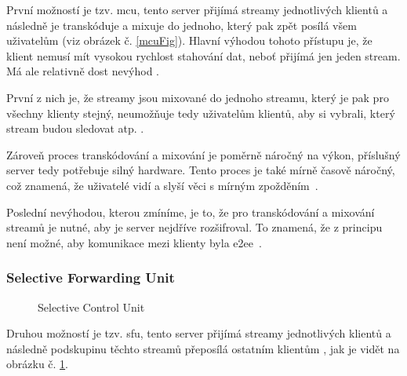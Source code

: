 První možností je tzv. \gls{mcu}, tento server přijímá streamy jednotlivých
klientů a následně je transkóduje a mixuje do jednoho, který pak zpět posílá
všem uživatelům (viz obrázek č. \ref{mcuFig}). Hlavní výhodou tohoto přístupu
je, že klient nemusí mít vysokou rychlost stahování dat, neboť přijímá jen jeden
stream. Má ale relativně dost nevýhod
\parencite{Red5Pro-WebRTCScalingApproaches}.

První z nich je, že streamy jsou mixované do jednoho streamu, který je pak pro
všechny klienty stejný, neumožňuje tedy uživatelům klientů, aby si vybrali,
který stream budou sledovat atp. \parencite{Red5Pro-WebRTCScalingApproaches}.

Zároveň proces transkódování a mixování je poměrně náročný na výkon, příslušný
server tedy potřebuje silný hardware. Tento proces je také mírně časově náročný,
což znamená, že uživatelé vidí a slyší věci s mírným
zpožděním~\parencite{Red5Pro-WebRTCScalingApproaches}.

Poslední nevýhodou, kterou zmíníme, je to, že pro transkódování a mixování
streamů je nutné, aby je server nejdříve rozšifroval. To znamená, že z principu
není možné, aby komunikace mezi klienty byla
\gls{e2ee}~\parencite{ITSecurityKnowHow-E2EGainsANewMeaning}.

\subsubsection{Selective Forwarding Unit}\label{sfu}

\begin{figure}[H]
    \centering
    \caption{Selective Control Unit}
    \label{sfuFig}
\end{figure}

Druhou možností je tzv. \gls{sfu}, tento server přijímá streamy jednotlivých
klientů a následně podskupinu těchto streamů přeposílá ostatním klientům
\parencite{HalOpenScience-SFUs}, jak je vidět na obrázku č. \ref{sfuFig}.

